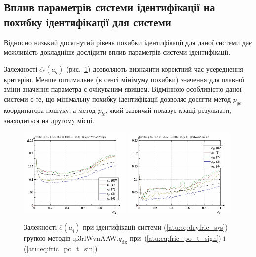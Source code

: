 



\subsection{Вплив параметрів системи ідентифікації на похибку ідентифікації для системи} %

Відносно низький досягнутий рівень похибки ідентифікації для
даної системи дає можливість докладніше дослідити вплив параметрів
системи ідентифікації.


Залежності
$ \overline{e_*} (a_q) $
(рис.~\ref{atu:f:fric_a_q_ql3rlWvnAAW_q_dx}) дозволяють визначити
коректний час усереднення критерію. Менше оптимальне (в сенсі
мінімуму похибки) значення для плавної зміни значення
параметра є очікуваним явищем. Відмінною особливістю даної
системи є те, що мінімальну похибку ідентифікації дозволяє
досягти метод
$ p_{ge} $ координатора пошуку, а метод
$ p_{le} $, який зазвичай показує кращі результати, знаходиться на
другому місці.


\begin{figure}[htb!]
  \centerline{
    \includegraphics[width=0.49\textwidth]{p/cha/fric/ql3rlWvnAAW/fric_id-p_a_q_sign.png}
    \hfill
    \includegraphics[width=0.49\textwidth]{p/cha/fric/ql3rlWvnAAW/fric_id-p_a_q_sin.png}
  }
\caption{Залежності $ \overline{e} (a_q)$ при ідентифікації системи (\ref{atu:eq:dryfric_sys}) групою методів ql3rlWvnAAW.$q_\mathrm{dx} $ при~(\ref{atu:eq:fric_po_t_sign}) і (\ref{atu:eq:fric_po_t_sin})}
\label{atu:f:fric_a_q_ql3rlWvnAAW_q_dx}
\end{figure}


